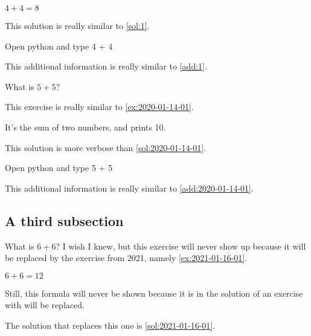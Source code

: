 \documentclass[oneside]{book}
\begin{document}
\begin{solution}
  \(4 + 4 = 8\)

  This solution is really similar to \cref{sol:1}.
\end{solution}

\begin{additionalinformation}
Open python and type 4 + 4

This additional information is really similar to \cref{add:1}.
\end{additionalinformation}

\begin{exercise}[examdate={January 15, 2020}, examproblemnumber={1}, examproblemid={2020-01-15-01}]
  What is \(5 + 5\)?

  This exercise is really similar to \cref{ex:2020-01-14-01}.
\end{exercise}

\begin{solution}
It's the sum of two numbers, and prints 10.

This solution is more verbose than \cref{sol:2020-01-14-01}.
\end{solution}

\begin{additionalinformation}
Open python and type 5 + 5

This additional information is really similar to \cref{add:2020-01-14-01}.
\end{additionalinformation}

\subsection{A third subsection}

\begin{exercise}[examdate={January 16, 2020}, examproblemnumber={1}, examproblemid={2020-01-16-01}, replacedbyexamproblemid={2021-01-16-01}, replacementsinceacademicyear={2025/2026}]
  What is \(6 + 6\)? I wish I knew, but this exercise will never show up because it will be replaced by the exercise from 2021, namely \cref{ex:2021-01-16-01}.
\end{exercise}

\begin{solution}
  \(6 + 6 = 12\)

Still, this formula will never be shown because it is in the solution of an exercise with will be replaced.

The solution that replaces this one is \cref{sol:2021-01-16-01}.
\end{solution}
\end{document}

